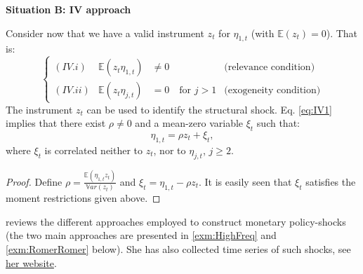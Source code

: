 \documentclass[
  12pt,
]{book}
\theoremstyle{definition}
\theoremstyle{definition}
\theoremstyle{definition}
\theoremstyle{definition}
\theoremstyle{remark}
\begin{document}
\textbf{Situation B: IV approach}

Consider now that we have a valid instrument \(z_t\) for \(\eta_{1,t}\) (with \(\mathbb{E}(z_t)=0\)). That is:
\begin{equation}
\left\{
\begin{array}{llll}
(IV.i) & \mathbb{E}(z_t \eta_{1,t}) &\ne 0 & \mbox{(relevance condition)} \\
(IV.ii) & \mathbb{E}(z_t \eta_{j,t}) &= 0 \quad \mbox{for } j>1 & \mbox{(exogeneity condition)}
\end{array}\right.\label{eq:IV1}
\end{equation}
The instrument \(z_t\) can be used to identify the structural shock. Eq. \eqref{eq:IV1} implies that there exist \(\rho \ne 0\) and a mean-zero variable \(\xi_t\) such that:
\[
\eta_{1,t} = \rho z_t + \xi_t,
\]
where \(\xi_t\) is correlated neither to \(z_t\), nor to \(\eta_{j,t}\), \(j\ge2\).

\begin{proof}
Define \(\rho = \frac{\mathbb{E}(\eta_{1,t}z_t)}{\mathbb{V}ar(z_t)}\) and \(\xi_t = \eta_{1,t} - \rho z_t\). It is easily seen that \(\xi_t\) satisfies the moment restrictions given above.
\end{proof}

\citet{Ramey_2016_NBER} reviews the different approaches employed to construct monetary policy-shocks (the two main approaches are presented in \ref{exm:HighFreq} and \ref{exm:RomerRomer} below). She has also collected time series of such shocks, see \href{https://econweb.ucsd.edu/~vramey/research.html\#mon}{her website}.
\end{document}
